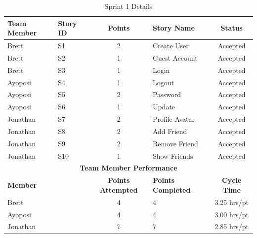\begin{table}[h]
\centering
\caption{Sprint 1 Details}
\label{tab:sprint-1-details}
\begin{tabular}{|l|l|c|p{4cm}|c|}
\hline
\textbf{Team Member} & \textbf{Story ID} & \textbf{Points} & \textbf{Story Name} & \textbf{Status} \\
\hline
Brett & S1 & 2 & Create User & Accepted \\
Brett & S2 & 1 & Guest Account & Accepted \\
Brett & S3 & 1 & Login & Accepted \\
Ayoposi & S4 & 1 & Logout & Accepted \\
Ayoposi & S5 & 2 & Password & Accepted \\
Ayoposi & S6 & 1 & Update & Accepted \\
Jonathan & S7 & 2 & Profile Avatar & Accepted \\
Jonathan & S8 & 2 & Add Friend & Accepted \\
Jonathan & S9 & 2 & Remove Friend & Accepted \\
Jonathan & S10 & 1 & Show Friends & Accepted \\
\hline
\multicolumn{5}{|c|}{\textbf{Team Member Performance}} \\
\hline
\multicolumn{2}{|l|}{\textbf{Member}} & \textbf{Points Attempted} & \textbf{Points Completed} & \textbf{Cycle Time} \\
\hline
\multicolumn{2}{|l|}{Brett} & 4 & 4 & 3.25 hrs/pt \\
\multicolumn{2}{|l|}{Ayoposi} & 4 & 4 & 3.00 hrs/pt \\
\multicolumn{2}{|l|}{Jonathan} & 7 & 7 & 2.85 hrs/pt \\
\hline
\end{tabular}
\end{table}

